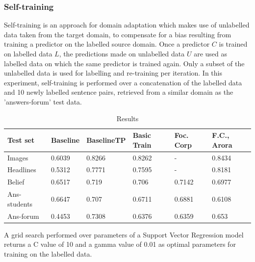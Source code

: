 \documentclass[11pt]{article}
\begin{document}
\subsubsection{Self-training}
Self-training is an approach for domain adaptation which makes use of unlabelled data taken from the target domain, to compensate for a bias resulting from training a predictor on the labelled source domain.  Once a predictor $C$ is trained on labelled data $L$, the predictions made on unlabelled data $U$ are used as labelled data on which the same predictor is trained again. Only a subset of the unlabelled data is used for labelling and re-training per iteration. In this experiment, self-training is performed over a concatenation of the labelled data and 10 newly labelled sentence pairs, retrieved from a similar domain as the 'answers-forum' test data. \\
\begin{table}[]
\centering
\caption{Results}
\label{results}
\begin{tabular}{|l|l|l|l|l|l|}
\hline
Test set         & Baseline & BaselineTP & Basic Train & Foc. Corp & F.C., Arora \\ \hline
Images           & 0.6039   & 0.8266     & 0.8262      & -              & 0.8434                       \\ \hline
Headlines        & 0.5312   & 0.7771     & 0.7595      & -              & 0.8181                       \\ \hline
Belief           & 0.6517   & 0.719      & 0.706       & 0.7142         & 0.6977                       \\ \hline
Ans-students & 0.6647   & 0.707      & 0.6711      & 0.6881         & 0.6108                       \\ \hline
Ans-forum    & 0.4453   & 0.7308     & 0.6376      & 0.6359         & 0.653                        \\ \hline
\end{tabular}
\end{table}
A grid search performed over parameters of a Support Vector Regression model returns a C value of 10 and a gamma value of 0.01 as optimal parameters for training on the labelled data. \\
\end{document}
